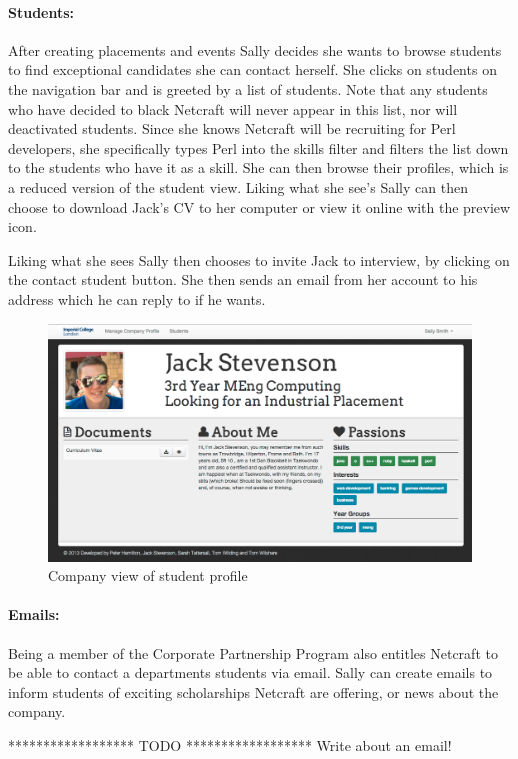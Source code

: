   \paragraph{Students:}
    After creating placements and events Sally decides she wants to browse students to find exceptional candidates she can contact herself. She clicks on students on the navigation bar and is greeted by a list of students. Note that any students who have decided to black Netcraft will never appear in this list, nor will deactivated students.
    Since she knows Netcraft will be recruiting for Perl developers, she specifically types Perl into the skills filter
    and filters the list down to the students who have it as a skill.
    She can then browse their profiles, which is a reduced version of the student view. Liking what she see's Sally can then choose to download Jack's CV to her computer or view it online with the preview icon. 

    Liking what she sees Sally then chooses to invite Jack to interview, by clicking on the contact student button. She then sends an email from her account to his address which he can reply to if he wants. 

    \begin{figure}[H]\centering
    \includegraphics[scale=0.3]{images/user_experiences/company/jack_profile}
    \caption{Company view of student profile}
    \end{figure}

  \paragraph{Emails:}
    Being a member of the Corporate Partnership Program also entitles Netcraft to be able to contact a departments students via email. Sally can create emails to inform students of exciting scholarships Netcraft are offering, or news about the company.

    ****************** TODO ******************
    Write about an email!

